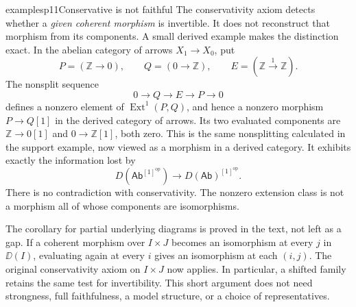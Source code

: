 \begin{dcomment}{examples}{p11}{Conservative is not faithful}
The conservativity axiom detects whether a \emph{given coherent morphism} is invertible. It does not reconstruct that morphism from its components. A small derived example makes the distinction exact. In the abelian category of arrows $X_1\to X_0$, put
\[
 P=(\mathbb Z\to0),\qquad Q=(0\to\mathbb Z),\qquad
 E=(\mathbb Z\xrightarrow{1}\mathbb Z).
\]
The nonsplit sequence
\[
 0\longrightarrow Q\longrightarrow E\longrightarrow P\longrightarrow0
\]
defines a nonzero element of $\operatorname{Ext}^1(P,Q)$, and hence a nonzero morphism $P\to Q[1]$ in the derived category of arrows. Its two evaluated components are $\mathbb Z\to0[1]$ and $0\to\mathbb Z[1]$, both zero. This is the same nonsplitting calculated in the support example, now viewed as a morphism in a derived category. It exhibits exactly the information lost by
\[
 D(\mathsf{Ab}^{[1]^{\mathrm{op}}})
 \longrightarrow D(\mathsf{Ab})^{[1]^{\mathrm{op}}}.
\]
There is no contradiction with conservativity. The nonzero extension class is not a morphism all of whose components are isomorphisms.

The corollary for partial underlying diagrams is proved in the text, not left as a gap. If a coherent morphism over $I\times J$ becomes an isomorphism at every $j$ in $\DD(I)$, evaluating again at every $i$ gives an isomorphism at each $(i,j)$. The original conservativity axiom on $I\times J$ now applies. In particular, a shifted family retains the same test for invertibility. This short argument does not need strongness, full faithfulness, a model structure, or a choice of representatives.
\end{dcomment}


